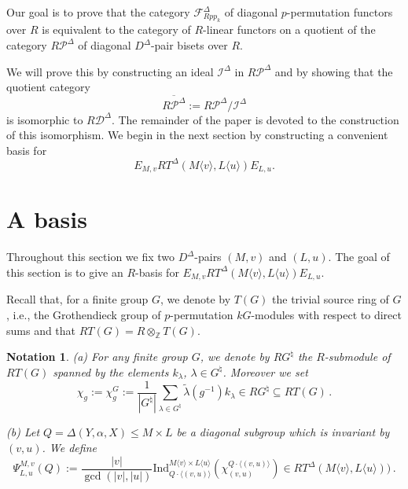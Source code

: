 \documentclass[11pt]{article}
\theoremstyle{change}  %
\newtheorem{notation}[theorem]{Notation}
\renewcommand{\le}{\leqslant} %
\newcommand{\calD}{\mathcal{D}}
\newcommand{\calF}{\mathcal{F}}
\newcommand{\calI}{\mathcal{I}}
\newcommand{\calP}{\mathcal{P}}
\newcommand{\Ind}{\mathrm{Ind}}
\newcommand{\ZZ}{\mathbb{Z}}
\newcommand{\DD}{D^{\Delta}}
\newcommand{\Mv}{M\langle v\rangle}
\def\Lu{L\langle u\rangle}
\begin{document}
Our goal is to prove
that the category $\calF_{Rpp_k}^\Delta$ of diagonal $p$-permutation functors over $R$ is
equivalent to the category of $R$-linear functors on a quotient of the
category $R\calP^\Delta$ of diagonal $\DD$-pair bisets over $R$.


We will prove this by constructing an ideal $\calI^\Delta$ in
$R\calP^\Delta$ and by showing that the quotient category
\[
\overline{R\calP^\Delta}:=R\calP^\Delta/\calI^\Delta
\]
is isomorphic to $R\calD^\Delta$. The remainder of the paper is devoted to 
the
construction of this isomorphism. We begin in the next section by constructing a convenient basis for
\[
E_{M,v}R T^\Delta(\Mv,\Lu)E_{L,u}.
\]



\section{A basis}

Throughout this section we fix two $\DD$-pairs $(M,v)$ and $(L,u)$. The goal of this section is to give an $R$-basis for $E_{M,v}RT^\Delta(\Mv,\Lu)E_{L,u}$.


Recall that, for a finite group $G$, we denote by $T(G)$ the trivial source ring of $G$, i.e., the Grothendieck group of $p$-permutation $kG$-modules with respect to direct sums and that $RT(G)=R\otimes_\ZZ T(G)$.

\begin{notation}
(a) For any finite group $G$, we denote by $RG^\natural$ the $R$-submodule of $RT(G)$ spanned by the elements $k_\lambda$, $\lambda\in G^\natural$. Moreover we set
\begin{equation*}
   \chi_g:=\chi_g^G:=\frac{1}{|G^\natural|} \sum_{\lambda\in G^\natural} \tilde{\lambda}(g^{-1}) k_\lambda\in RG^\natural\subseteq RT(G)\,.
\end{equation*}

\smallskip
(b) Let $Q=\Delta(Y,\alpha,X)\le M\times L$ be a diagonal subgroup which is invariant by $(v,u)$. We define
\begin{equation*}
   \Psi^{M,v}_{L,u}(Q):=
   \frac{|v|}{\gcd(|v|,|u|)}
   \Ind^{\Mv\times\Lu}_{Q\cdot \langle (v,u)\rangle} (\chi_{(v,u)}^{Q\cdot\langle (v,u)\rangle})  \in RT^\Delta(\Mv,\Lu))\,.
\end{equation*}
\end{notation}
\end{document}
